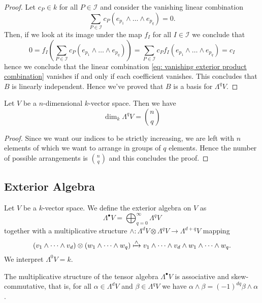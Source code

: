 \begin{proof}
  Let \(c_P \in k\) for all \(P \in \mathcal I\) and consider the vanishing
  linear combination
  \begin{equation}\label{eq: vanishing exterior product combination}
    \sum_{P \in \mathcal I} c_P (e_{p_1} \wedge \dots \wedge e_{p_q}) = 0.
  \end{equation}
  Then, if we look at its image under the map \(f_I\) for all \(I \in \mathcal
  I\) we conclude that
  \[
    0 = f_I\left( \sum_{P \in \mathcal I} c_P (e_{p_1} \wedge \dots \wedge
    e_{p_q}) \right) = \sum_{P \in \mathcal I} c_P f_I(e_{p_1} \wedge \dots \wedge
    e_{p_q}) = c_I
  \]
  hence we conclude that the linear combination \cref{eq: vanishing exterior
  product combination} vanishes if and only if each coefficient vanishes. This
  concludes that \(B\) is linearly independent. Hence we've proved that \(B\) is
  a basis for \(\Lambda^q V\).
\end{proof}

\begin{proposition}
  Let \(V\) be a \(n\)-dimensional \(k\)-vector space. Then we have
  \[
    \dim_k \Lambda^q V = \binom n q
  \]
\end{proposition}

\begin{proof}
  Since we want our indices to be strictly increasing, we are left with \(n\)
  elements of which we want to arrange in groups of \(q\) elements. Hence the
  number of possible arrangements is \(\binom n q\) and this concludes the
  proof.
\end{proof}

\subsection{Exterior Algebra}

\begin{definition}
  \label{def: exterior algebra}
  Let \(V\) be a \(k\)-vector space. We define the exterior algebra on \(V\) as
  \[
    \Lambda^\bullet V = \bigoplus_{q=0}^\infty \Lambda^q V
  \]
  together with a multiplicative structure \(\wedge: \Lambda^d V \otimes
  \Lambda^q V \to \Lambda^{d+q} V\) mapping
  \[
    (v_1 \wedge \dots \wedge v_d) \otimes (w_1 \wedge \dots \wedge w_q) \xmapsto
    \wedge v_1 \wedge \dots \wedge v_d \wedge w_1 \wedge \dots \wedge w_q.
  \]
  We interpret \(\Lambda^0 V = k\).
\end{definition}

\begin{proposition}\label{prop:exterior-algebra-associative-skew-commutative}
  The multiplicative structure of the tensor algebra \(\Lambda^\bullet V\) is
  associative and skew-commutative, that is, for all \(\alpha \in \Lambda^d V\)
  and \(\beta \in \Lambda^q V\) we have \(\alpha \wedge \beta = (-1)^{d q} \beta
  \wedge \alpha\).
\end{proposition}

